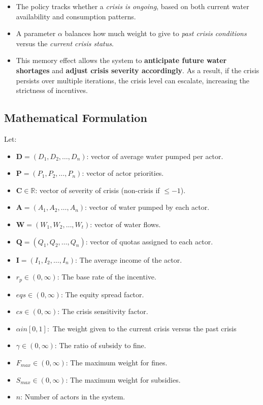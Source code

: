 \documentclass[a4paper, 12pt]{article}
\begin{document}
\begin{itemize}
    \item The policy tracks whether a \textit{crisis is ongoing}, based on both current water availability and 
    consumption patterns.
    \item A parameter \(\alpha\) balances how much weight to give to \textit{past crisis conditions} versus the 
    \textit{current crisis status}.
    \item This memory effect allows the system to \textbf{anticipate future water shortages} and 
    \textbf{adjust crisis severity accordingly}. As a result, if the crisis persists over multiple iterations, the crisis level can escalate, increasing 
    the strictness of incentives.

\end{itemize}

\subsection{Mathematical Formulation}
Let:
\begin{itemize}
    \item $\mathbf{D} = (D_1, D_2, \dots, D_n)$: vector of average water pumped per actor.
    \item $\mathbf{P} = (P_1, P_2, \dots, P_n)$: vector of actor priorities.
    \item $\mathbf{C} \in \mathbb{R}$: vector of severity of crisis (non-crisis if $\leq -1$).
    \item $\mathbf{A} = (A_1, A_2, \dots, A_n)$: vector of water pumped by each actor.
    \item $\mathbf{W} = (W_1, W_2, \dots, W_t)$: vector of water flows.
    \item $\mathbf{Q} = (Q_1, Q_2, \dots, Q_n)$: vector of quotas assigned to each actor.
    \item $\mathbf{I} = (I_1, I_2, \dots, I_n)$: The average income of the actor.
    \item ${r_p} \in (0,\infty)$: The base rate of the incentive.
    \item $eqs \in (0, \infty)$: The equity spread factor.
    \item $cs \in (0, \infty)$: The crisis sensitivity factor.
    \item $\alpha in [0, 1]:$ The weight given to the current crisis versus the past crisis
    \item $\gamma \in (0, \infty)$: The ratio of subsidy to fine.
    \item $F_{max} \in (0, \infty)$: The maximum weight for fines.
    \item $S_{max} \in (0, \infty)$: The maximum weight for subsidies.
    \item \(n\): Number of actors in the system.
\end{itemize}
\end{document}
